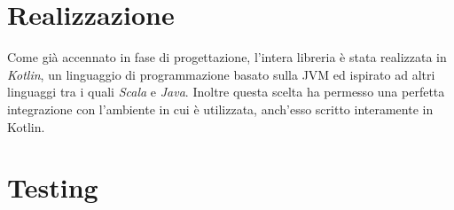 \section{Realizzazione}

	
	Come già accennato in fase di progettazione, l'intera libreria è stata realizzata in \textit{Kotlin}, un linguaggio di programmazione basato sulla JVM ed ispirato ad altri linguaggi tra i quali \textit{Scala} e \textit{Java}. Inoltre questa scelta ha permesso una perfetta integrazione con l'ambiente in cui è utilizzata, anch'esso scritto interamente in Kotlin.

\section{Testing}










%
%	
%	
%		
%	

